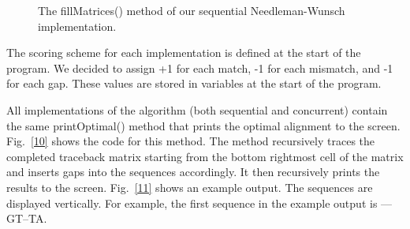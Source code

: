 \documentclass[conference]{IEEEtran}
\begin{document}
\begin{figure}[htbp]
\centerline{}
\caption{The fillMatrices() method of our sequential Needleman-Wunsch implementation.}
\label{9}
\end{figure}

The scoring scheme for each implementation is defined at the start of the program. We decided to assign +1 for each match, -1 for each mismatch, and -1 for each gap. These values are stored in variables at the start of the program.

All implementations of the algorithm (both sequential and concurrent) contain the same printOptimal() method that prints the optimal alignment to the screen. Fig.~\ref{10} shows the code for this method. The method recursively traces the completed traceback matrix starting from the bottom rightmost cell of the matrix and inserts gaps into the sequences accordingly. It then recursively prints the results to the screen. Fig.~\ref{11} shows an example output. The sequences are displayed vertically. For example, the first sequence in the example output is ––GT–TA.
\end{document}
